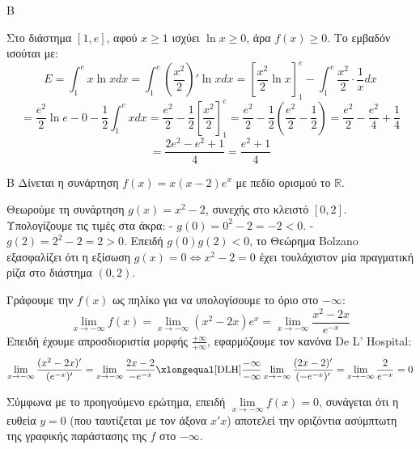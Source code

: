 \begin{thema}{Β}
\begin{erwthma}
\item Στο διάστημα $[1, e]$, αφού $x \ge 1$ ισχύει $\ln x \ge 0$, άρα $f(x) \ge 0$. Το εμβαδόν ισούται με:
\[ E = \int_1^e x \ln x dx = \int_1^e \left(\frac{x^2}{2}\right)' \ln x dx = \left[ \frac{x^2}{2} \ln x \right]_1^e - \int_1^e \frac{x^2}{2} \cdot \frac{1}{x} dx \]
\[ = \frac{e^2}{2} \ln e - 0 - \frac{1}{2} \int_1^e x dx = \frac{e^2}{2} - \frac{1}{2} \left[ \frac{x^2}{2} \right]_1^e = \frac{e^2}{2} - \frac{1}{2} \left( \frac{e^2}{2} - \frac{1}{2} \right) = \frac{e^2}{2} - \frac{e^2}{4} + \frac{1}{4} \]
\[ = \frac{2e^2 - e^2 + 1}{4} = \frac{e^2+1}{4} \]
\end{erwthma}
\end{thema}

\begin{thema}{Β}
Δίνεται η συνάρτηση $f(x) = x(x-2)e^x$ με πεδίο ορισμού το $\mathbb{R}$.
\begin{erwthma}
\item Θεωρούμε τη συνάρτηση $g(x) = x^2 - 2$, συνεχής στο κλειστό $[0, 2]$.
Υπολογίζουμε τις τιμές στα άκρα:
- $g(0) = 0^2 - 2 = -2 < 0$.
- $g(2) = 2^2 - 2 = 2 > 0$.
Επειδή $g(0)g(2) < 0$, το Θεώρημα Bolzano εξασφαλίζει ότι η εξίσωση $g(x)=0 \Leftrightarrow x^2-2=0$ έχει τουλάχιστον μία πραγματική ρίζα στο διάστημα $(0, 2)$.

\item Γράφουμε την $f(x)$ ως πηλίκο για να υπολογίσουμε το όριο στο $-\infty$:
\[ \lim_{x\to-\infty} f(x) = \lim_{x\to-\infty} (x^2-2x)e^x = \lim_{x\to-\infty} \frac{x^2-2x}{e^{-x}} \]
Επειδή έχουμε απροσδιοριστία μορφής $\frac{+\infty}{+\infty}$, εφαρμόζουμε τον κανόνα De L' Hospital:
\[ \lim_{x\to-\infty} \frac{(x^2-2x)'}{(e^{-x})'} = \lim_{x\to-\infty} \frac{2x-2}{-e^{-x}} \xlongequal[\text{DLH}]{\frac{-\infty}{-\infty}} \lim_{x\to-\infty} \frac{(2x-2)'}{(-e^{-x})'} = \lim_{x\to-\infty} \frac{2}{e^{-x}} = 0 \]

\item Σύμφωνα με το προηγούμενο ερώτημα, επειδή $\lim\limits_{x\to-\infty} f(x) = 0$, συνάγεται ότι η ευθεία $y = 0$ (που ταυτίζεται με τον άξονα $x'x$) αποτελεί την οριζόντια ασύμπτωτη της γραφικής παράστασης της $f$ στο $-\infty$.


\end{erwthma}
\end{thema}
